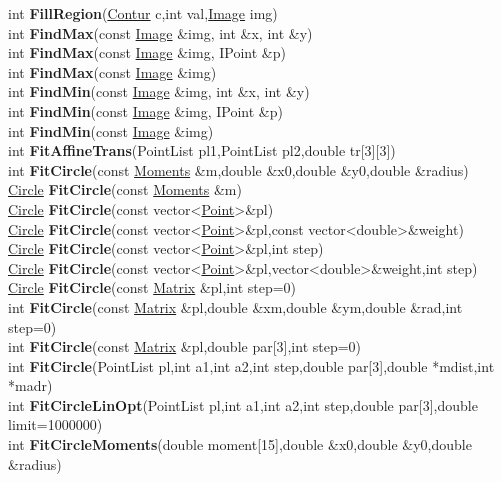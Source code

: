 \documentclass[10pt,titlepage]{article}
\def\functionlistentry#1#2#3#4#5#6{\noindent #1 {\bf #2}(#3) \dotfill #6\\}
\def\letterref#1{}
\def\letterlabelend#1{}
\begin{document}
{{\letterref{Fe}
\letterref{Fi}
\letterref{Fm}
\letterref{Fo}
\letterref{Fr}
\letterref{Fu}
\letterlabelend{Fi}
\functionlistentry{int}{FillRegion}{\hyperlink{Contur}{Contur} c,int val,\hyperlink{Image}{Image} img}{1337}{graphics}{}
\functionlistentry{int}{FindMax}{const \hyperlink{Image}{Image} \&img, int \&x, int \&y}{1069}{processing}{}
\functionlistentry{int}{FindMax}{const \hyperlink{Image}{Image} \&img, IPoint \&p}{1070}{processing}{}
\functionlistentry{int}{FindMax}{const \hyperlink{Image}{Image} \&img}{1071}{processing}{}
\functionlistentry{int}{FindMin}{const \hyperlink{Image}{Image} \&img, int \&x, int \&y}{1066}{processing}{}
\functionlistentry{int}{FindMin}{const \hyperlink{Image}{Image} \&img, IPoint \&p}{1067}{processing}{}
\functionlistentry{int}{FindMin}{const \hyperlink{Image}{Image} \&img}{1068}{processing}{}
\functionlistentry{int}{FitAffineTrans}{PointList pl1,PointList pl2,double tr[3][3]}{1589}{obsolet}{}
\functionlistentry{int}{FitCircle}{const \hyperlink{Moments}{Moments} \&m,double \&x0,double \&y0,double \&radius}{854}{moments}{}
\functionlistentry{\hyperlink{Circle}{Circle}}{FitCircle}{const \hyperlink{Moments}{Moments} \&m}{855}{moments}{}
\functionlistentry{\hyperlink{Circle}{Circle}}{FitCircle}{const vector\textless {}\hyperlink{Point}{Point}\textgreater  \&pl}{1168}{fitting}{}
\functionlistentry{\hyperlink{Circle}{Circle}}{FitCircle}{const vector\textless {}\hyperlink{Point}{Point}\textgreater  \&pl,const vector\textless {}double\textgreater  \&weight}{1169}{fitting}{}
\functionlistentry{\hyperlink{Circle}{Circle}}{FitCircle}{const vector\textless {}\hyperlink{Point}{Point}\textgreater  \&pl,int step}{1170}{fitting}{}
\functionlistentry{\hyperlink{Circle}{Circle}}{FitCircle}{const vector\textless {}\hyperlink{Point}{Point}\textgreater  \&pl,vector\textless {}double\textgreater  \&weight,int step}{1171}{fitting}{}
\functionlistentry{\hyperlink{Circle}{Circle}}{FitCircle}{const \hyperlink{Matrix}{Matrix} \&pl,int step=0}{1172}{fitting}{}
\functionlistentry{int}{FitCircle}{const \hyperlink{Matrix}{Matrix} \&pl,double \&xm,double \&ym,double \&rad,int step=0}{1173}{fitting}{}
\functionlistentry{int}{FitCircle}{const \hyperlink{Matrix}{Matrix} \&pl,double par[3],int step=0}{1174}{fitting}{}
\functionlistentry{int}{FitCircle}{PointList pl,int a1,int a2,int step,double par[3],double *mdist,int *madr}{1175}{fitting}{}
\functionlistentry{int}{FitCircleLinOpt}{PointList pl,int a1,int a2,int step,double par[3],double limit=1000000}{1176}{fitting}{}
\functionlistentry{int}{FitCircleMoments}{double moment[15],double \&x0,double \&y0,double \&radius}{1627}{obsolet}{}
}}
\end{document}
